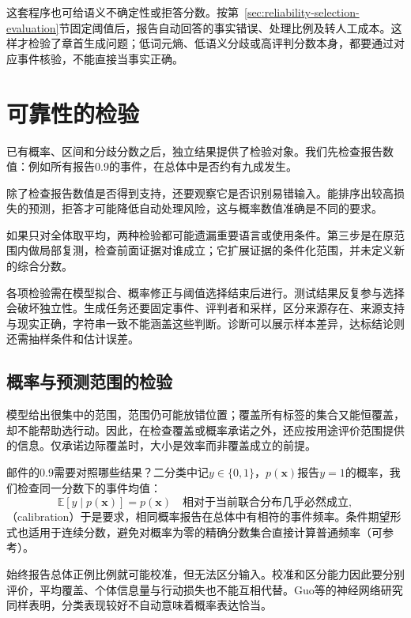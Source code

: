 这套程序也可给语义不确定性或拒答分数。按第~\ref{sec:reliability-selection-evaluation}节固定阈值后，报告自动回答的事实错误、处理比例及转人工成本。这样才检验了章首生成问题；低词元熵、低语义分歧或高评判分数本身，都要通过对应事件核验，不能直接当事实正确。

\section{可靠性的检验}
\label{sec:reliability-evaluation}

已有概率、区间和分歧分数之后，独立结果提供了检验对象。我们先检查报告数值：例如所有报告0.9的事件，在总体中是否约有九成发生。

除了检查报告数值是否得到支持，还要观察它是否识别易错输入。能排序出较高损失的预测，拒答才可能降低自动处理风险，这与概率数值准确是不同的要求。

如果只对全体取平均，两种检验都可能遗漏重要语言或使用条件。第三步是在原范围内做局部复测，检查前面证据对谁成立；它扩展证据的条件化范围，并未定义新的综合分数。

各项检验需在模型拟合、概率修正与阈值选择结束后进行。测试结果反复参与选择会破坏独立性。生成任务还要固定事件、评判者和采样，区分来源存在、来源支持与现实正确，字符串一致不能涵盖这些判断。诊断可以展示样本差异，达标结论则还需抽样条件和估计误差。

\subsection{概率与预测范围的检验}
\label{sec:reliability-output-evaluation}

模型给出很集中的范围，范围仍可能放错位置；覆盖所有标签的集合又能恒覆盖，却不能帮助选行动。因此，在检查覆盖或概率承诺之外，还应按用途评价范围提供的信息。仅承诺边际覆盖时，大小是效率而非覆盖成立的前提。

邮件的0.9需要对照哪些结果？二分类中记$y\in\{0,1\}$，$p(\bm{x})$报告$y=1$的概率，我们检查同一分数下的事件均值：
\begin{equation}
 \mathbb E[y\mid p(\bm{x})]=p(\bm{x})
\quad\text{相对于当前联合分布几乎必然成立},
 \label{eq:reliability-calibration}
\end{equation}
（calibration）于是要求，相同概率报告在总体中有相符的事件频率。条件期望形式也适用于连续分数，避免对概率为零的精确分数集合直接计算普通频率（可参考）。

始终报告总体正例比例就可能校准，但无法区分输入。校准和区分能力因此要分别评价，平均覆盖、个体信息量与行动损失也不能互相代替。Guo等的神经网络研究同样表明，分类表现较好不自动意味着概率表达恰当。

